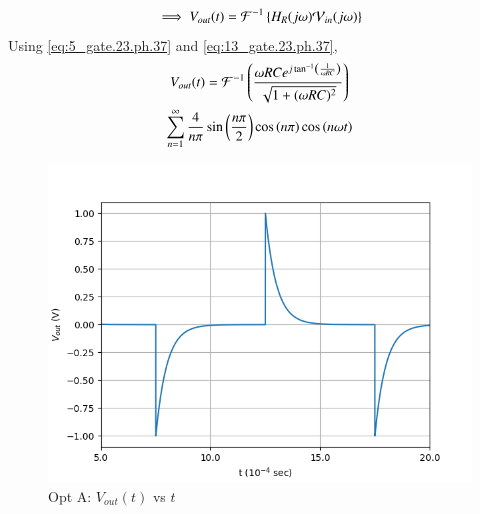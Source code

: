\documentclass[journal,12pt,twocolumn]{IEEEtran}
\theoremstyle{remark}
\begin{document}
\begin{enumerate}
\begin{align}
        \implies V_{out}(t) &= \mathcal{F}^{-1}\left\{H_R(j\omega)\mathcal{V}_{in}(j\omega)\right\}\\
    \end{align}
    Using \eqref{eq:5_gate.23.ph.37} and \eqref{eq:13_gate.23.ph.37}, 
    \begin{multline}
    V_{out}(t)=\mathcal{F}^{-1}\left(\frac{\omega R C e^{j\tan^{-1}\left(\frac{1}{\omega RC}\right)}}{\sqrt{1 + (\omega R C)^2}}\right)\\ \sum_{n = 1}^{\infty}\frac{4}{n\pi}\sin{\ensuremath{\left(\frac{n\pi}{2}\right)}}\cos\left({n\pi}\right) \cos{\ensuremath{\left(n\omega t\right)}}
    \end{multline}
    \begin{figure}[!h]
        \centering
        \includegraphics[width = \columnwidth]{figs/opt_a_res.png}
        \caption{Opt A: $V_{out}(t)$ vs $t$}
        \label{fig:opt_a_res_gate.23.ph.37}
    \end{figure}


\end{enumerate}
\end{document}
